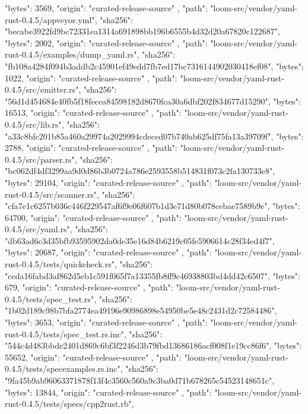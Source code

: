 {{      "bytes": 3569,
      "origin": "curated-release-source"
    },
    {
      "path": "loom-src/vendor/yaml-rust-0.4.5/appveyor.yml",
      "sha256": "becabe3922fd9bc72331ea1314a691898bb196b6555b4d32d20a67820c122687",
      "bytes": 2002,
      "origin": "curated-release-source"
    },
    {
      "path": "loom-src/vendor/yaml-rust-0.4.5/examples/dump_yaml.rs",
      "sha256": "fb108a4284f094b3addb2c45901ef49edd7fb7ed17bc7316144902030418ef08",
      "bytes": 1022,
      "origin": "curated-release-source"
    },
    {
      "path": "loom-src/vendor/yaml-rust-0.4.5/src/emitter.rs",
      "sha256": "56d1d454684e40fb5f18fecea84598182d8670fca30a6dbf202f834677d15290",
      "bytes": 16513,
      "origin": "curated-release-source"
    },
    {
      "path": "loom-src/vendor/yaml-rust-0.4.5/src/lib.rs",
      "sha256": "a33c8bfc201b85a460a29974a2029994cdeced07b740ab625df75fa13a39709f",
      "bytes": 2788,
      "origin": "curated-release-source"
    },
    {
      "path": "loom-src/vendor/yaml-rust-0.4.5/src/parser.rs",
      "sha256": "bc062df4df3299aa9d0d86b3b0724a786e2593558b514831f073c2fa130733e8",
      "bytes": 29104,
      "origin": "curated-release-source"
    },
    {
      "path": "loom-src/vendor/yaml-rust-0.4.5/src/scanner.rs",
      "sha256": "cfa7e1c6257b036c446f229547af6f9e06f607b1d3e71d80b078cebae7589b9e",
      "bytes": 64700,
      "origin": "curated-release-source"
    },
    {
      "path": "loom-src/vendor/yaml-rust-0.4.5/src/yaml.rs",
      "sha256": "db63ad6c3d35bfb93595902da0de35e16d84b6219c05fe5906614c28f34ed4f7",
      "bytes": 20687,
      "origin": "curated-release-source"
    },
    {
      "path": "loom-src/vendor/yaml-rust-0.4.5/tests/quickcheck.rs",
      "sha256": "ceda16fabd3af862d5eb1c591f065f7a13355fb8ff9c46938803bd4dd42c6507",
      "bytes": 679,
      "origin": "curated-release-source"
    },
    {
      "path": "loom-src/vendor/yaml-rust-0.4.5/tests/spec_test.rs",
      "sha256": "1b02d189c98b7bfa2774ea49196e90986898e54950be5e48c2431d2c72584486",
      "bytes": 3653,
      "origin": "curated-release-source"
    },
    {
      "path": "loom-src/vendor/yaml-rust-0.4.5/tests/spec_test.rs.inc",
      "sha256": "544c4d483bbde2401d869c6bf3f2246d3b79fbd13686186acf008f1e19cc86f6",
      "bytes": 55652,
      "origin": "curated-release-source"
    },
    {
      "path": "loom-src/vendor/yaml-rust-0.4.5/tests/specexamples.rs.inc",
      "sha256": "9fa45b9ab96063371878f13f4c3560c560a9c3ba0d71b678265c54523148651c",
      "bytes": 13844,
      "origin": "curated-release-source"
    },
    {
      "path": "loom-src/vendor/yaml-rust-0.4.5/tests/specs/cpp2rust.rb",
}}
